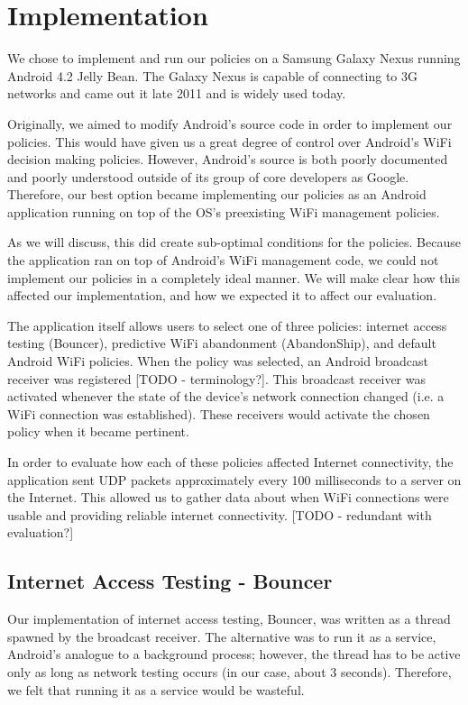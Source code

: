 \section{Implementation}
\label{sec:impl}

We chose to implement and run our policies on a Samsung Galaxy Nexus running Android 4.2 Jelly Bean. The Galaxy Nexus is capable of connecting to 3G networks and came out it late 2011 and is widely used today.

Originally, we aimed to modify Android's source code in order to implement our policies. This would have given us a great degree of control over Android's WiFi decision making policies. However, Android's source is both poorly documented and poorly understood outside of its group of core developers as Google. Therefore, our best option became implementing our policies as an Android application running on top of the OS's preexisting WiFi management policies.

As we will discuss, this did create sub-optimal conditions for the policies. Because the application ran on top of Android's WiFi management code, we could not implement our policies in a completely ideal manner. We will make clear how this affected our implementation, and how we expected it to affect our evaluation.

The application itself allows users to select one of three policies: internet access testing (Bouncer), predictive WiFi abandonment (AbandonShip), and default Android WiFi policies. When the policy was selected, an Android broadcast receiver was registered [TODO - terminology?]. This broadcast receiver was activated whenever the state of the device's network connection changed (i.e. a WiFi connection was established). These receivers would activate the chosen policy when it became pertinent.

In order to evaluate how each of these policies affected Internet connectivity, the application sent UDP packets approximately every 100 milliseconds to a server on the Internet. This allowed us to gather data about when WiFi connections were usable and providing reliable internet connectivity. [TODO - redundant with evaluation?]

\subsection{Internet Access Testing - Bouncer}
Our implementation of internet access testing, Bouncer, was written as a thread spawned by the broadcast receiver. The alternative was to run it as a service, Android's analogue to a background process; however, the thread has to be active only as long as network testing occurs (in our case, about 3 seconds). Therefore, we felt that running it as a service would be wasteful.

